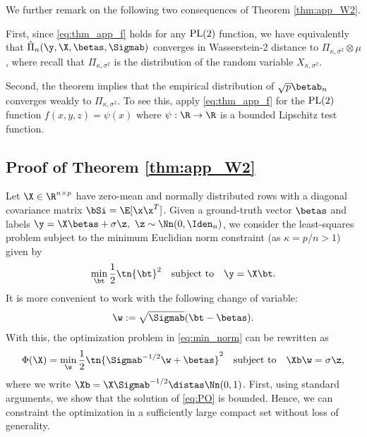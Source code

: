 We further remark on the following two consequences of Theorem \ref{thm:app_W2}. 

First, since \eqref{eq:thm_app_f} holds for any $\rm{PL}(2)$ function, we have equivalently that $\hat\Pi_n(\y,\X,\betas,\Sigmab)$ converges in Wasserstein-2 distance to $\Pi_{\kappa,\sigma^2}\otimes\mu$, where recall that $\Pi_{\kappa,\sigma^2}$ is the distribution of the random variable $X_{\kappa,\sigma^2}$.

Second, the theorem implies that the empirical distribution of $\sqrt{p}\betab_n$ converges weakly to $\Pi_{\kappa,\sigma^2}$. To see this, apply \eqref{eq:thm_app_f} for the $\rm{PL}(2)$ function $f(x,y,z) = \psi(x)$ where  $\psi:\R\rightarrow\R$ is a bounded Lipschitz test function. 

\subsection{Proof of Theorem \ref{thm:app_W2}}
\vspace{5pt}
Let $\X\in\R^{n\times p}$ have zero-mean and normally distributed rows with a diagonal covariance matrix $\bSi=\E[\x\x^T]$. Given a ground-truth vector $\betas$ and labels $\y=\X\betas+\sigma \z,~\z\sim\Nn(0,\Iden_n)$, we consider the least-squares problem subject to the minimum Euclidian norm constraint (as $\kappa=p/n>1$) given by
\begin{align}\label{eq:PO_beta}
\min_{\bt}\frac{1}{2}\tn{\bt}^2\quad\text{subject to}\quad \y=\X\bt.
\end{align}
It is more convenient to work with the following change of variable: 
\begin{align}\label{eq:w}
\w:=\sqrt{\Sigmab}(\bt-\betas).
\end{align}
 With this, the optimization problem  in \eqref{eq:min_norm} can be rewritten as
\begin{align}\label{eq:PO}
\Phi(\X)=\min_{\w} \frac{1}{2}\tn{\Sigmab^{-1/2}\w+\betas}^2\quad\text{subject to}\quad \Xb\w=\sigma \z,
\end{align}
where we write $\Xb=\X\Sigmab^{-1/2}\distas\Nn(0,1)$. First, using standard arguments, we show that the solution of \eqref{eq:PO} is bounded. Hence, we can constraint the optimization in a sufficiently large compact set without loss of generality.


